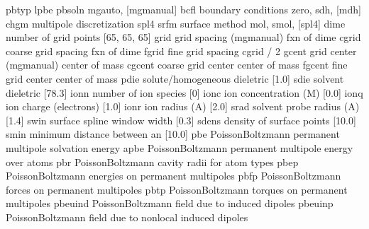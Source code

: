 \documentclass[letterpaper,11pt,english]{sphinxmanual}
\begin{document}
\begin{sphinxVerbatim}[commandchars=\\\{\}]
pbtyp           lpbe
pbsoln          mg\PYGZhy{}auto, [mg\PYGZhy{}manual]
bcfl            boundary conditions              zero, sdh, [mdh]
chgm            multipole discretization         spl4
srfm            surface method                   mol, smol, [spl4]
dime            number of grid points            [65, 65, 65]
grid            grid spacing (mg\PYGZhy{}manual)         fxn of \PYGZdq{}dime\PYGZdq{}
cgrid           coarse grid spacing              fxn of \PYGZdq{}dime\PYGZdq{}
fgrid           fine grid spacing                cgrid / 2
gcent           grid center (mg\PYGZhy{}manual)          center of mass
cgcent          coarse grid center               center of mass
fgcent          fine grid center                 center of mass
pdie            solute/homogeneous dieletric     [1.0]
sdie            solvent dieletric                [78.3]
ionn            number of ion species            [0]
ionc            ion concentration (M)            [0.0]
ionq            ion charge (electrons)           [1.0]
ionr            ion radius (A)                   [2.0]
srad            solvent probe radius (A)         [1.4]
swin            surface spline window width      [0.3]
sdens           density of surface points        [10.0]
smin            minimum distance between an      [10.0]
pbe             Poisson\PYGZhy{}Boltzmann permanent multipole solvation energy
apbe            Poisson\PYGZhy{}Boltzmann permanent multipole energy over atoms
pbr             Poisson\PYGZhy{}Boltzmann cavity radii for atom types
pbep            Poisson\PYGZhy{}Boltzmann energies on permanent multipoles
pbfp            Poisson\PYGZhy{}Boltzmann forces on permanent multipoles
pbtp            Poisson\PYGZhy{}Boltzmann torques on permanent multipoles
pbeuind         Poisson\PYGZhy{}Boltzmann field due to induced dipoles
pbeuinp         Poisson\PYGZhy{}Boltzmann field due to non\PYGZhy{}local induced dipoles
\end{sphinxVerbatim}

\sphinxAtStartPar
{}
\end{document}
